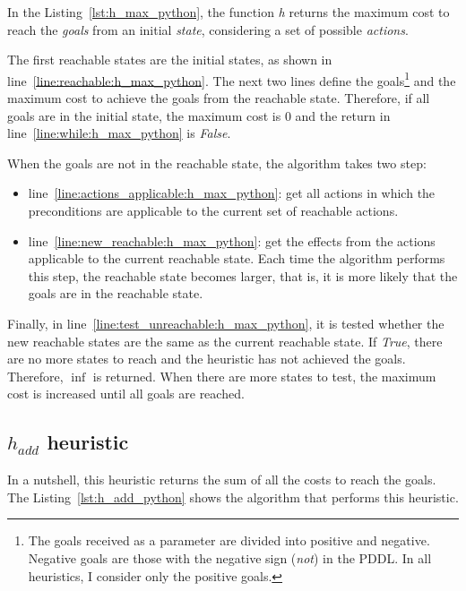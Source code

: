 \documentclass[letterpaper]{article}
\begin{document}
In the Listing~\ref{lst:h_max_python}, the function \textit{h} returns the maximum cost to reach the \textit{goals} from an initial \textit{state}, considering a set of possible \textit{actions}.

The first reachable states are the initial states, as shown in line~\ref{line:reachable:h_max_python}. The next two lines define the goals\footnote{The goals received as a parameter are divided into positive and negative. Negative goals are those with the negative sign (\textit{not}) in the PDDL. In all heuristics, I consider only the positive goals.} and the maximum cost to achieve the goals from the reachable state. Therefore, if all goals are in the initial state, the maximum cost is $0$ and the return in line~\ref{line:while:h_max_python} is \textit{False}.

When the goals are not in the reachable state, the algorithm takes two step:

\begin{itemize}
  \item line~\ref{line:actions_applicable:h_max_python}: get all actions in which the preconditions are applicable to the current set of reachable actions.
  \item line~\ref{line:new_reachable:h_max_python}: get the effects from the actions applicable to the current reachable state. Each time the algorithm performs this step, the reachable state becomes larger, that is, it is more likely that the goals are in the reachable state.
\end{itemize}

Finally, in line~\ref{line:test_unreachable:h_max_python}, it is tested whether the new reachable states are the same as the current reachable state. If \textit{True}, there are no more states to reach and the heuristic has not achieved the goals. Therefore, $\inf$ is returned. When there are more states to test, the maximum cost is increased until all goals are reached.

\subsection{$h_{add}$ heuristic}

In a nutshell, this heuristic returns the sum of all the costs to reach the goals. The Listing~\ref{lst:h_add_python} shows the algorithm that performs this heuristic.


\end{document}
